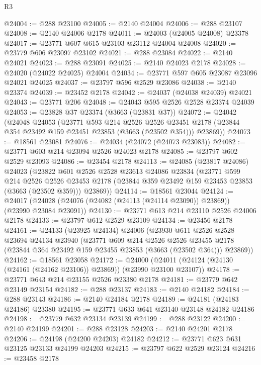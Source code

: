 \begin{lexlean}{R3}
\begin{coremodule}
@24004 := @288 @23100
@24005 := @2140 @24004
@24006 := @288 @23107
@24008 := @2140 @24006 @2178
@24011 := @24003 (@24005 @24008) @23378
@24017 := @23771 @607 @615 @23103 @23112 @24004 @24008
@24020 := @23779 @606 @23097 @23102
@24021 := @288 @23084
@24022 := @2140 @24021
@24023 := @288 @23091
@24025 := @2140 @24023 @2178
@24028 := @24020 (@24022 @24025) @24004
@24034 := @23771 @597 @605 @23087 @23096 @24021 @24025
@24037 := @23797 @596 @2529 @23086
@24038 := @2140 @23374
@24039 := @23452 @2178
@24042 := @24037 (@24038 @24039) @24021
@24043 := @23771 @206
@24048 := @24043 @595 @2526 @2528 @23374 @24039
@24053 := @23828 @37 @23374 (@3663 (@23831 @37))
@24072 := @24042
    (@24048
      @24053
      (@23771
        @593
        @214
        @2526
        @2526
        @23451
        @2178
        (@23844 @354 @23492 @159 @23451 @23853 (@3663 (@23502 @354)))
        @23869))
@24073 := @18561 @23081
@24076 := @24034 (@24072 (@24073 @23083))
@24082 := @23771 @603 @214 @23094 @2526 @24023 @2178
@24085 := @23797 @602 @2529 @23093
@24086 := @23454 @2178
@24113 := @24085
    (@23817 @24086)
    @24023
    (@23822
      @601
      @2526
      @2528
      @23613
      @24086
      @23834
      (@23771
        @599
        @214
        @2526
        @2526
        @23453
        @2178
        (@23844 @359 @23492 @159 @23453 @23853 (@3663 (@23502 @359)))
        @23869))
@24114 := @18561 @23044
@24124 := @24017 (@24028 (@24076 (@24082 (@24113 (@24114 @23090)) @23869)) (@23990 @23084 @23091))
@24130 := @23771 @613 @214 @23110 @2526 @24006 @2178
@24133 := @23797 @612 @2529 @23109
@24134 := @23456 @2178
@24161 := @24133
    (@23925 @24134)
    @24006
    (@23930
      @611
      @2526
      @2528
      @23694
      @24134
      @23940
      (@23771
        @609
        @214
        @2526
        @2526
        @23455
        @2178
        (@23844 @364 @23492 @159 @23455 @23853 (@3663 (@23502 @364)))
        @23869))
@24162 := @18561 @23058
@24172 := @24000 (@24011 (@24124 (@24130 (@24161 (@24162 @23106)) @23869)) (@23990 @23100 @23107))
@24178 := @23771 @643 @214 @23155 @2526 @23380 @2178
@24181 := @23779 @642 @23149 @23154
@24182 := @288 @23137
@24183 := @2140 @24182
@24184 := @288 @23143
@24186 := @2140 @24184 @2178
@24189 := @24181 (@24183 @24186) @23380
@24195 := @23771 @633 @641 @23140 @23148 @24182 @24186
@24198 := @23779 @632 @23134 @23139
@24199 := @288 @23122
@24200 := @2140 @24199
@24201 := @288 @23128
@24203 := @2140 @24201 @2178
@24206 := @24198 (@24200 @24203) @24182
@24212 := @23771 @623 @631 @23125 @23133 @24199 @24203
@24215 := @23797 @622 @2529 @23124
@24216 := @23458 @2178

\end{coremodule}
\end{lexlean}
